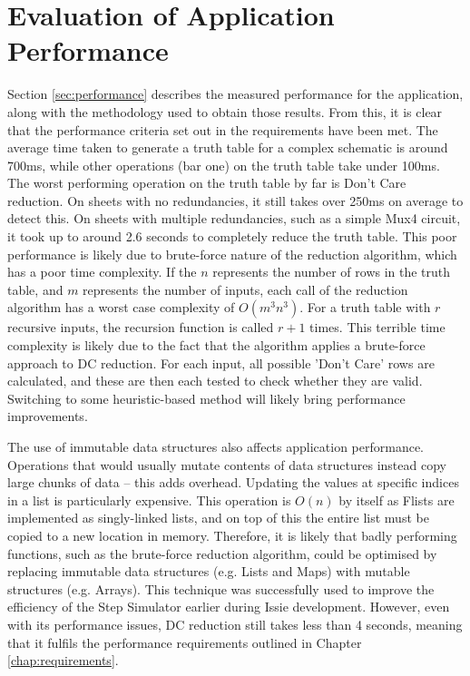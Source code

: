 \section{Evaluation of Application Performance}
Section \ref{sec:performance} describes the measured performance for the application, along with the methodology used to obtain those results. From this, it is clear that the performance criteria set out in the requirements have been met. The average time taken to generate a truth table for a complex schematic is around 700ms, while other operations (bar one) on the truth table take under 100ms. The worst performing operation on the truth table by far is Don't Care reduction. On sheets with no redundancies, it still takes over 250ms on average to detect this. On sheets with multiple redundancies, such as a simple Mux4 circuit, it took up to around 2.6 seconds to completely reduce the truth table. This poor performance is likely due to brute-force nature of the reduction algorithm, which has a poor time complexity. If the $n$ represents the number of rows in the truth table, and $m$ represents the number of inputs, each call of the reduction algorithm has a worst case complexity of $O(m^3n^3)$. For a truth table with $r$ recursive inputs, the recursion function is called $r+1$ times. This terrible time complexity is likely due to the fact that the  algorithm applies a brute-force approach to DC reduction. For each input, all possible 'Don't Care' rows are calculated, and these are then each tested to check whether they are valid. Switching to some heuristic-based method will likely bring performance improvements. 

The use of immutable data structures also affects application performance. Operations that would usually mutate contents of data structures instead copy large chunks of data -- this adds overhead. Updating the values at specific indices in a list is particularly expensive. This operation is $O(n)$ by itself as F\fsharp lists are implemented as singly-linked lists, and on top of this the entire list must be copied to a new location in memory. Therefore, it is likely that badly performing functions, such as the brute-force reduction algorithm, could be optimised by replacing immutable data structures (e.g. Lists and Maps) with mutable structures (e.g. Arrays). This technique was successfully used to improve the efficiency of the Step Simulator earlier during Issie development.  However, even with its performance issues, DC reduction still takes less than 4 seconds, meaning that it fulfils the performance requirements outlined in Chapter \ref{chap:requirements}.

